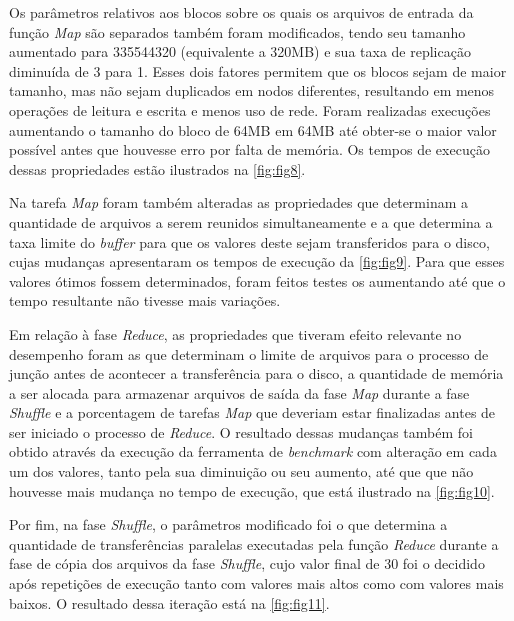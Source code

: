 
\newpage
Os parâmetros relativos aos blocos sobre os quais os arquivos de entrada da função \textit{Map} são separados também foram modificados, tendo seu tamanho aumentado para 335544320 (equivalente a 320MB) e sua taxa de replicação diminuída de 3 para 1. Esses dois fatores permitem que os blocos sejam de maior tamanho, mas não sejam duplicados em nodos diferentes, resultando em menos operações de leitura e escrita e menos uso de rede. Foram realizadas execuções aumentando o tamanho do bloco de 64MB em 64MB até obter-se o maior valor possível antes que houvesse erro por falta de memória. Os tempos de execução dessas propriedades estão ilustrados na \autoref{fig:fig8}.


Na tarefa \textit{Map} foram também alteradas as propriedades que determinam a quantidade de arquivos a serem reunidos simultaneamente e a que determina a taxa limite do \textit{\gls{buffer}} para que os valores deste sejam transferidos para o disco, cujas mudanças apresentaram os tempos de execução da \autoref{fig:fig9}. Para que esses valores ótimos fossem determinados, foram feitos testes os aumentando até que o tempo resultante não tivesse mais variações.


Em relação à fase \textit{Reduce}, as propriedades que tiveram efeito relevante no desempenho foram as que determinam o limite de arquivos para o processo de junção antes de acontecer a transferência para o disco, a quantidade de memória a ser alocada para armazenar arquivos de saída da fase \textit{Map} durante a fase \textit{Shuffle} e a porcentagem de tarefas \textit{Map} que deveriam estar finalizadas antes de ser iniciado o processo de \textit{Reduce}. O resultado dessas mudanças também foi obtido através da execução da ferramenta de \textit{\gls{benchmark}} com alteração em cada um dos valores, tanto pela sua diminuição ou seu aumento, até que que não houvesse mais mudança no tempo de execução, que está ilustrado na \autoref{fig:fig10}.

\newpage
Por fim, na fase \textit{Shuffle}, o parâmetros modificado foi o que determina a quantidade de transferências paralelas executadas pela função \textit{Reduce} durante a fase de cópia dos arquivos da fase \textit{Shuffle}, cujo valor final de 30 foi o decidido após repetições de execução tanto com valores mais altos como com valores mais baixos. O resultado dessa iteração está na \autoref{fig:fig11}.

